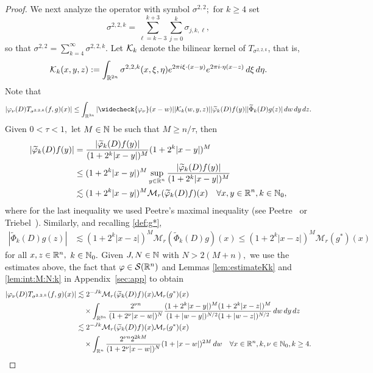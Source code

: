 \begin{proof}
We next analyze the operator with  symbol $\sigma^{2,2};$ for $k \geq 4$ set 
\begin{equation*}
\sigma^{2,2,k}  = \sum\limits_{\ell =k-3}^{k+3} \sum\limits_{j=0}^k \sigma_{j,k,\ell},
\end{equation*}
so that $\sigma^{2,2} = \sum\limits_{k=4}^\infty \sigma^{2,2,k}.$ 
 Let $\mathcal{K}_k$ denote the bilinear kernel of  $T_{\sigma^{2,2,k}}$, that is,
$$
\mathcal{K}_k(x,y,z):= \int_{\mathbb{R}^{2n}} \sigma^{2,2,k}(x, \xi, \eta) e^{2\pi i \xi \cdot( x- y)} e^{2\pi i \cdot \eta (x-z)} \, d\xi \, d\eta.
$$
Note that
\begin{align*}
| \f_\nu(D) T_{\sigma^{2,2,k}}(f,g)(x)| \leq \int_{\re^{3n}} |\widecheck{\f_\nu}(x- w)| |\K_k(w, y, z)| |\widetilde{\f}_k(D)f(y)| |\widetilde{\Phi}_k(D)g(z)| \, dw \dy \dz.
\end{align*}
Given $0<\tau <1,$  let $M \in \mathbb{N}$ be such that $M \geq n/\tau$, then
\begin{align*}
|\widetilde{\varphi}_k(D)f(y)|&  = \frac{|\widetilde{\varphi}_k(D)f(y)|}{(1 + 2^k |x-y|)^M} (1 + 2^k |x-y|)^M\\
& \leq  (1 + 2^k |x-y|)^M \sup_{y\in{{\mathbb R}^n}} \frac{|\widetilde{\varphi}_k(D)f(y)|}{(1 + 2^k |x-y|)^M} \\
& \lesssim (1 + 2^k |x-y|)^M \mathcal{M}_r(\widetilde{\varphi}_k(D)f)(x)\quad\forall x,y\in{{\mathbb R}^n},k\in\mathbb{N}_0,
\end{align*}
where for the last inequality we used Peetre's maximal inequality (see Peetre~\cite{MR0380394} or Triebel~\cite[p.16, Theorem 1.3.1]{MR3024598}). Similarly, and recalling \eqref{def:g*},
\begin{align*}
|\widetilde{\Phi}_k(D)g(z)| & \lesssim (1 + 2^k |x-z|)^M \mathcal{M}_r(\widetilde{\Phi}_k(D)g)(x)  \leq (1 + 2^k |x-z|)^M \mathcal{M}_r(g^*)(x)
\end{align*}
for all $ x,z\in{{\mathbb R}^n},$ $k\in\mathbb{N}_0.$
Given $J, N \in \mathbb{N}$ with $N>2(M+n),$  we use the estimates above, the fact that $\varphi\in{\mathcal{S}}({{\mathbb R}^n})$ and Lemmas \ref{lem:estimateKk} and  \ref{lem:int:M:N:k}  in Appendix~\ref{sec:app} to obtain 
\begin{align*}
 |\f_\nu(D) T_{\sigma^{2,2,k}}(f,g)(x)| &\lesssim 2^{-Jk} \mathcal{M}_r(\widetilde{\f}_k(D)f)(x) \mathcal{M}_r(g^*)(x)\\
 &\quad\times \int_{\re^{3n}} \frac{2^{\nu n}}{(1+ 2^\nu |x- w|)^N} \frac{(1 + 2^k |x-y|)^M (1 + 2^k |x-z|)^M}{(1+ |w-y|)^{N/2} (1+ |w-z|)^{N/2}} \, dw \dy \dz\\
&\lesssim 2^{-Jk} \mathcal{M}_r(\widetilde{\f}_k(D)f)(x) \mathcal{M}_r(g^*)(x)\\
&\quad \times \int_{\rn}  \frac{2^{\nu n} 2^{2kM}}{(1+ 2^\nu |x- w|)^N}(1 +  |x-w|)^{2M} \, dw\quad \forall x\in\rn,k,\nu\in\na_0, k\ge 4.

\end{align*}
\end{proof}
